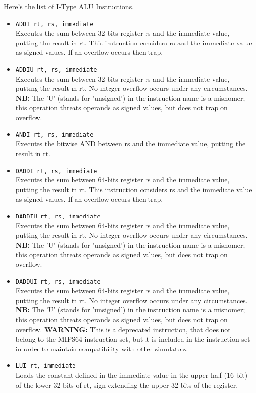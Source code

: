 \documentclass[12pt]{report}
\newcommand{\MS}{MIPS64}
\newcommand{\WARN}{\textbf{WARNING:} This is a deprecated instruction, that
does not belong to the \MS{} instruction set, but it is included in the instruction
set in order to maintain compatibility with other simulators.}
\newcommand{\MISN}{\textbf{NB:} The 'U' (stands for 'unsigned') in the instruction name is a misnomer; 
this operation threats operands as signed values, but does not trap on overflow.}
\begin{document}
Here's the list of I-Type ALU Instructions.

\begin{itemize}
	\item \texttt{ADDI rt, rs, immediate}\\
	Executes the sum between 32-bits register rs and the immediate value, putting the result in rt.
	This instruction considers rs and the immediate value as signed values.
	If an overflow occurs then trap.

	\item \texttt{ADDIU rt, rs, immediate}\\
	Executes the sum between 32-bits register rs and the immediate value, putting the result in rt.
	No integer overflow occurs under any circumstances.
	\MISN{}

	\item \texttt{ANDI rt, rs, immediate}\\
	Executes the bitwise AND between rs and the immediate value, putting the result in rt.

	\item \texttt{DADDI rt, rs, immediate}\\
	Executes the sum between 64-bits register rs and the immediate value, putting the result in rt.
	This instruction considers rs and the immediate value as signed values.
	If an overflow occurs then trap.

	\item \texttt{DADDIU rt, rs, immediate}\\
	Executes the sum between 64-bits register rs and the immediate value, putting the result in rt.
	No integer overflow occurs under any circumstances.
	\MISN{}

	\item \texttt{DADDUI rt, rs, immediate}\\
	Executes the sum between 64-bits register rs and the immediate value, putting the result in rt.
	No integer overflow occurs under any circumstances.
	\MISN{}
    \WARN{}

	\item \texttt{LUI rt, immediate}\\
	Loads the constant defined in the immediate value in the upper half (16 bit) of the
	lower 32 bits of rt, sign-extending the upper 32 bits of the register.


\end{itemize}
\end{document}
